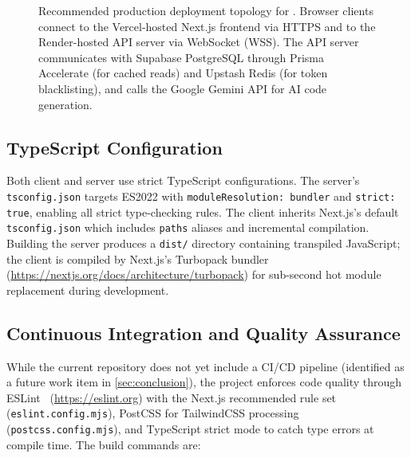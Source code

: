 \begin{figure}[H]
  \caption{Recommended production deployment topology for \echoray{}.
    Browser clients connect to the Vercel-hosted Next.js frontend via HTTPS
    and to the Render-hosted API server via WebSocket (WSS). The API server
    communicates with Supabase PostgreSQL through Prisma Accelerate (for
    cached reads) and Upstash Redis (for token blacklisting), and calls the
    Google Gemini API for AI code generation.}
  \label{fig:deploy_arch}
\end{figure}

\subsection{TypeScript Configuration}

Both client and server use strict TypeScript configurations. The server's
\texttt{tsconfig.json} targets ES2022 with \texttt{moduleResolution: bundler}
and \texttt{strict: true}, enabling all strict type-checking rules. The client
inherits Next.js's default \texttt{tsconfig.json} which includes
\texttt{paths} aliases and incremental compilation. Building the server
produces a \texttt{dist/} directory containing transpiled JavaScript; the
client is compiled by Next.js's Turbopack bundler~\cite{nextjs2025}
(\url{https://nextjs.org/docs/architecture/turbopack}) for sub-second hot
module replacement during development.

\subsection{Continuous Integration and Quality Assurance}

While the current repository does not yet include a CI/CD pipeline (identified
as a future work item in \cref{sec:conclusion}), the project enforces code
quality through ESLint~\cite{eslint2024} (\url{https://eslint.org}) with the
Next.js recommended rule set (\texttt{eslint.config.mjs}), PostCSS for
TailwindCSS processing (\texttt{postcss.config.mjs}), and TypeScript strict
mode to catch type errors at compile time. The build commands are:


